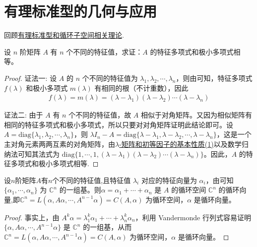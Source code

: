 \documentclass[../../main.tex]{subfiles}
\begin{document}
\section{有理标准型的几何与应用}

回顾\hyperref[section:有理标准型]{有理标准型和循环子空间相关理论}.

\begin{proposition}\label{proposition:矩阵有不同特征值则特征多项式和极小多项式一定相等}
设 $n$ 阶矩阵 $A$ 有 $n$ 个不同的特征值，求证：$A$ 的特征多项式和极小多项式相等。
\end{proposition}
\begin{proof}
{\color{blue}证法一:}
设 $A$ 的 $n$ 个不同的特征值为 $\lambda_1,\lambda_2,\cdots,\lambda_n$，则由可知，特征多项式 $f(\lambda)$ 和极小多项式 $m(\lambda)$ 有相同的根（不计重数），因此 
\begin{align*}
f(\lambda)=m(\lambda)=(\lambda - \lambda_1)(\lambda - \lambda_2)\cdots(\lambda - \lambda_n)
\end{align*}

{\color{blue}证法二:}
由于 $A$ 有 $n$ 个不同的特征值，故 $A$ 相似于对角矩阵。又因为相似矩阵有相同的特征多项式和极小多项式，所以只要对对角矩阵证明此结论即可。设 $A = \mathrm{diag}\{\lambda_1,\lambda_2,\cdots,\lambda_n\}$，则 $\lambda I_n - A = \mathrm{diag}\{\lambda - \lambda_1,\lambda - \lambda_2,\cdots,\lambda - \lambda_n\}$，这是一个主对角元素两两互素的对角矩阵，由\hyperref[theorem:lambda-矩阵和初等因子的基本性质]{$\lambda$-矩阵和初等因子的基本性质(1)}以及数学归纳法可知其法式为 $\mathrm{diag}\{1,\cdots,1,(\lambda - \lambda_1)(\lambda - \lambda_2)\cdots(\lambda - \lambda_n)\}$。因此，$A$ 的特征多项式和极小多项式相等.
\end{proof}

\begin{proposition}\label{proposition:不同特征值对应的特征向量之和恰好构成循环向量}
设$n$阶矩阵$A$有$n$个不同的特征值,且特征值 $\lambda_i$ 对应的特征向量为 $\alpha_i$，由可知$\{\alpha_1,\cdots,\alpha_n\}$ 为 $\mathbb{C}^n$ 的一组基。则$\alpha = \alpha_1 + \cdots + \alpha_n$ 是 $A$ 的循环空间 $\mathbb{C}^n$ 的循环向量,即$\mathbb{C}^n = L(\alpha,A\alpha,\cdots,A^{n - 1}\alpha)=C(A,\alpha)$ 为循环空间，$\alpha$ 是循环向量。
\end{proposition}
\begin{proof}
事实上，由 $A^k\alpha = \lambda_1^k\alpha_1 + \cdots + \lambda_n^k\alpha_n$，利用 Vandermonde 行列式容易证明 $\{\alpha,A\alpha,\cdots,A^{n - 1}\alpha\}$ 是 $\mathbb{C}^n$ 的一组基，从而 $\mathbb{C}^n = L(\alpha,A\alpha,\cdots,A^{n - 1}\alpha)=C(A,\alpha)$ 为循环空间，$\alpha$ 是循环向量。
\end{proof}
\end{document}

